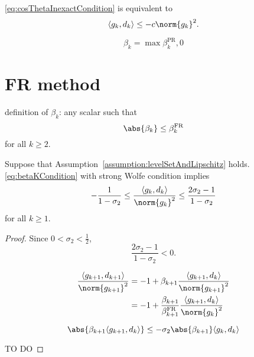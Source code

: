 \documentclass[\main/main]{subfiles}
\begin{document}
\eqref{eq:cosThetaInexactCondition} is equivalent to
\begin{equation}
    \langle g_k, d_k \rangle \leq -c \norm{g_k}^2.
\end{equation}

\begin{equation}
    \beta_k = \max{\beta_k^{\mathrm{PR}}, 0}
\end{equation}

\section{FR method}

definition of $\beta_k$: any scalar such that
\begin{equation}\label{eq:betaKCondition}
    \abs{\beta_k} \leq \beta_k^{\mathrm{FR}}
\end{equation}
for all $k \geq 2$.


\begin{lemma}
    Suppose that Assumption~\ref{assumption:levelSetAndLipschitz} holds.
    \eqref{eq:betaKCondition} with strong Wolfe condition implies
    \begin{equation}
        - \frac{1}{1-\sigma_2} \leq \frac{\langle g_k, d_k \rangle}{\norm{g_k}^2} \leq \frac{2 \sigma_2 -1}{1-\sigma_2}
    \end{equation}
    for all $k \geq 1$.
\end{lemma}
\begin{proof}
    Since $0 < \sigma_2 < \frac{1}{2}$,
    \begin{equation}
        \frac{2 \sigma_2 -1}{1-\sigma_2} < 0.
    \end{equation}

    \begin{align}
        \frac{\langle g_{k+1}, d_{k+1} \rangle}{\norm{g_{k+1}}^2} & = -1 + \beta_{k+1} \frac{\langle g_{k+1}, d_k \rangle}{\norm{g_{k+1}}^2} \notag                        \\
                                                                  & = -1 + \frac{\beta_{k+1}}{\beta_{k+1}^{\mathrm{FR}}} \frac{\langle g_{k+1}, d_k \rangle}{\norm{g_k}^2}
    \end{align}

    \begin{equation*}
        \abs{\beta_{k+1} \langle g_{k+1}, d_k \rangle} \leq -\sigma_2 \abs{\beta_{k+1}} \langle g_k, d_k \rangle
    \end{equation*}

    TO DO
\end{proof}
\end{document}
